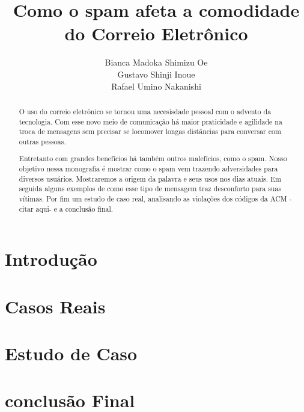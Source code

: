 \documentclass{article}
\title{Como o spam afeta a comodidade do Correio Eletrônico}
\author{Bianca Madoka Shimizu Oe\\
		Gustavo Shinji Inoue\\
		Rafael Umino Nakanishi}
\begin{document}
\maketitle

\begin{abstract}
	O uso do correio eletrônico se tornou uma necesisdade pessoal com o advento da tecnologia. Com esse novo meio de comunicação há maior praticidade e agilidade na troca de mensagens sem precisar se locomover longas distâncias para conversar com outras pessoas.

	Entretanto com grandes benefícios há também outros malefícios, como o spam. Nosso objetivo nessa monografia é mostrar como o spam vem trazendo adversidades para diversos usuários. Mostraremos a origem da palavra e seus usos nos dias atuais. Em seguida alguns exemplos de como esse tipo de mensagem traz desconforto para suas vítimas. Por fim um estudo de caso real, analisando as violações dos códigos da ACM -citar aqui- e a conclusão final.
\end{abstract}

\section{Introdução}

\section{Casos Reais}

\section{Estudo de Caso}

\section{conclusão Final}
\end{document}

